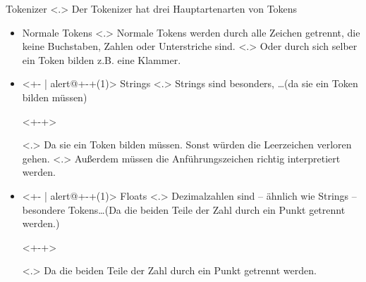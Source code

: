   \begin{frame}{Tokenizer}
    \pause
        \note[item]<.>{
          Der Tokenizer hat drei Hauptartenarten von Tokens
        }
    \begin{itemize}[<+- | alert@+>]
      \item
        Normale Tokens
            \note[item]<.>{
              Normale Tokens werden durch alle Zeichen getrennt, die keine Buchstaben, Zahlen oder Unterstriche sind.
            }
            \note[item]<.>{
               Oder durch sich selber ein Token bilden  z.B. eine Klammer.
            }

      \item<+- | alert@+-+(1)>
        Strings
            \note[item]<.>{
              Strings sind besonders, \ldots (da sie ein Token bilden müssen)
            }
        \begin{uncoverenv}<+-+>%
        \end{uncoverenv}
            \note[item]<.>{
              Da sie ein Token bilden müssen. Sonst würden die Leerzeichen verloren gehen.
            }
            \note[item]<.>{
              Außerdem müssen die Anführungszeichen richtig interpretiert werden.
            }

      \item<+- | alert@+-+(1)>
        Floats
            \note[item]<.>{
              Dezimalzahlen sind -- ähnlich wie Strings -- besondere Tokens\ldots (Da die beiden Teile der Zahl durch ein Punkt getrennt werden.)
            }


        \begin{uncoverenv}<+-+>%
        \end{uncoverenv}
            \note[item]<.>{
              Da die beiden Teile der Zahl durch ein Punkt getrennt werden.
            }
    \end{itemize}
  \end{frame}

